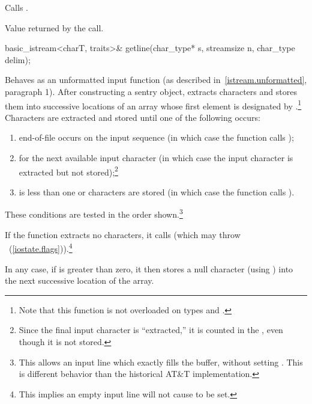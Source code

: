 \begin{itemdescr}
\pnum
\effects
Calls
.

\pnum
\returns
Value returned by the call.
\end{itemdescr}

%
\begin{itemdecl}
basic_istream<charT, traits>& getline(char_type* s, streamsize n,
                                      char_type delim);
\end{itemdecl}

\begin{itemdescr}
\pnum
\effects
Behaves as an unformatted input function
(as described in~\ref{istream.unformatted}, paragraph 1).
After constructing a sentry object, extracts
characters and stores them
into successive locations of an array whose first element is designated by
.\footnote{Note that this function is not overloaded on types
and
.}
Characters are extracted and stored until one of the following occurs:
\begin{enumerate}
\item
end-of-file occurs on the input sequence
(in which case the function calls
);
\item
{}
for the next available input
character 
(in which case the input character is extracted but not stored);\footnote{Since
the final input character is ``extracted,''
it is counted in the
,
even though it is not stored.}
\item
{} is less than one or 
characters are stored
(in which case the function calls
).
\end{enumerate}

\pnum
These conditions are tested in the order shown.\footnote{This allows an input
line which exactly fills the buffer, without setting
.
This is different behavior than the historical AT\&T implementation.}

\pnum
If the function extracts no characters, it calls
(which may throw
~(\ref{iostate.flags})).\footnote{This implies an
empty input line will not cause
to be set.}

\pnum
In any case, if  is greater than zero, it then stores a null character
(using
)
into the next successive location of the array.


\end{itemdescr}

